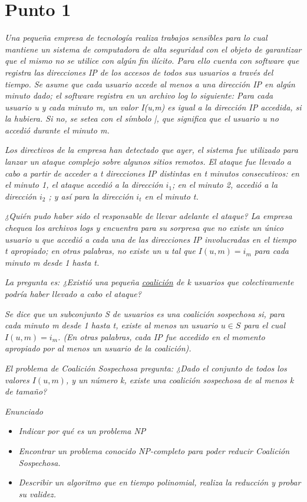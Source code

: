 \section{Punto 1}
\textit{Una pequeña empresa de tecnología realiza trabajos sensibles para lo cual mantiene un sistema de computadora de alta seguridad con el objeto de garantizar que el mismo no se utilice con algún fin ilícito. Para ello cuenta con software que registra las direcciones IP de los accesos de todos sus usuarios a través del tiempo.
Se asume que cada usuario accede al menos a una dirección IP en algún minuto dado; el
software registra en un archivo log lo siguiente:
Para cada usuario u y cada minuto m, un valor I(u,m) es igual a la dirección IP accedida, si la hubiera. Si no, se setea con el símbolo |, que significa que el usuario u no accedió durante el minuto m.
}

\textit{Los directivos de la empresa han detectado que ayer, el sistema fue utilizado para lanzar un ataque complejo sobre algunos sitios remotos. El ataque fue llevado a cabo a partir de acceder a t direcciones IP distintas en t minutos consecutivos: en el minuto 1, el ataque accedió a la dirección $i_1$; en el minuto 2, accedió a la dirección $i_2$ ; y así para la dirección $i_t$ en el minuto t.}

\textit{¿Quién pudo haber sido el responsable de llevar adelante el ataque? La empresa chequea los archivos logs y encuentra para su sorpresa que no existe un único usuario u que accedió a cada una de las direcciones IP involucradas en el tiempo t apropiado; en otras palabras, no existe un u tal que $I(u,m)=i_m$ para cada minuto m desde 1 hasta t.
}

\textit{La pregunta es: ¿Existió una pequeña \underline{coalición} de k usuarios que colectivamente podría haber llevado a cabo el ataque?}

\textit{Se dice que un subconjunto S de usuarios es una coalición sospechosa si, para cada minuto m desde 1 hasta t, existe al menos un usuario $u \in S$ para el cual $I(u,m)=i_m$. (En otras palabras, cada IP fue accedido en el momento apropiado por al menos un usuario de la coalición).
}

\textit{El problema de Coalición Sospechosa pregunta: ¿Dado el conjunto de todos los valores $I(u,m)$, y un número k, existe una coalición sospechosa de al menos k de tamaño?
}

\textit{Enunciado}
\begin{itemize}
  \item \textit{Indicar por qué es un problema NP}
  \item \textit{Encontrar un problema conocido NP-completo para poder reducir Coalición Sospechosa.}
  \item \textit{Describir un algoritmo que en tiempo polinomial, realiza la reducción y probar su validez.}
\end{itemize}

